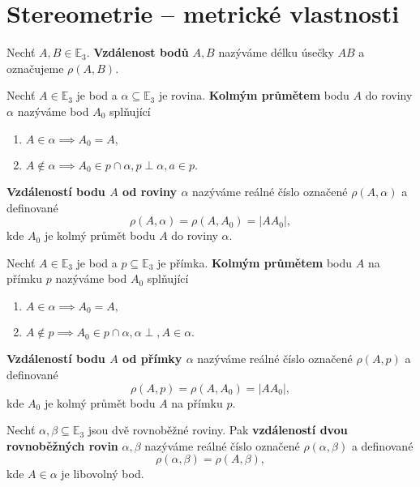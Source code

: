 \section{Stereometrie -- metrické vlastnosti}
\begin{definition}
    Nechť $A, B \in \mathbb E_3.$ \textbf{Vzdálenost bodů} $A,B$ nazýváme délku
    úsečky $AB$ a označujeme $\rho(A,B).$
\end{definition}

\begin{definition}
    Nechť $A\in \mathbb E_3$ je bod a $\alpha \subseteq \mathbb E_3$ je rovina.
    \textbf{Kolmým průmětem} bodu $A$ do roviny $\alpha$ nazýváme bod $A_0$
    splňující
    \begin{enumerate}[$i.$]
    \item $A\in \alpha \implies A_0=A,$
   	\item $A\notin \alpha \implies A_0 \in p\cap \alpha, p \perp\alpha, a \in p.$
    \end{enumerate}
    \textbf{Vzdáleností bodu $A$ od roviny $\alpha$} nazýváme reálné číslo označené
    $\rho(A,\alpha) $ a definované
    $$\rho(A,\alpha) = \rho(A, A_0) = |AA_0|,$$
    kde $A_0$ je kolmý průmět bodu $A$ do roviny $\alpha.$
\end{definition}

\begin{definition}
    Nechť $A\in \mathbb E_3$ je bod a $p \subseteq \mathbb E_3$ je přímka.
    \textbf{Kolmým průmětem} bodu $A$ na přímku $p$ nazýváme bod $A_0$
    splňující
    \begin{enumerate}[$i.$]
    \item $A\in \alpha \implies A_0=A,$
    \item $A\notin p \implies A_0 \in p\cap \alpha, \alpha \perp, A \in \alpha.$
    \end{enumerate}
    \textbf{Vzdáleností bodu $A$ od přímky $\alpha$} nazýváme reálné číslo označené
    $\rho(A,p) $ a definované
    $$\rho(A,p) = \rho(A, A_0) = |AA_0|,$$
    kde $A_0$ je kolmý průmět bodu $A$ na přímku $p.$
\end{definition}

\begin{definition}
    Nechť $\alpha, \beta \subseteq \mathbb E_3$ jsou dvě rovnoběžné roviny. Pak
    \textbf{vzdáleností dvou rovnoběžných rovin} $\alpha, \beta$ nazýváme reálné
    číslo označené $\rho(\alpha, \beta)$ a definované
    $$\rho(\alpha, \beta)=\rho(A,\beta),$$
    kde $A\in\alpha$ je libovolný bod.
\end{definition}


